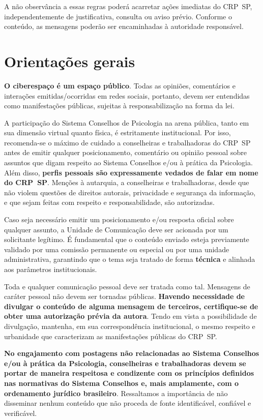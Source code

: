 A não observância a essas regras poderá acarretar ações imediatas do
CRP~SP, independentemente de justificativa, consulta ou aviso prévio.
Conforme o conteúdo, as mensagens poderão ser encaminhadas à autoridade
responsável.

\clearpage
\section{Orientações gerais}

\textbf{O ciberespaço é um espaço público}. Todas as opiniões,
comentários e interações emitidas/ocorridas em redes sociais, portanto,
devem ser entendidas como manifestações públicas, sujeitas à
responsabilização na forma da lei.

A participação do Sistema Conselhos de Psicologia na arena pública,
tanto em sua dimensão virtual quanto física, é estritamente
institucional. Por isso, recomenda-se o máximo de cuidado a conselheiras
e trabalhadoras do CRP~SP antes de emitir qualquer posicionamento,
comentário ou opinião pessoal sobre assuntos que digam respeito ao
Sistema Conselhos e/ou à prática da Psicologia. Além disso,
\textbf{perfis pessoais são expressamente vedados de falar em nome do
	CRP~SP}. Menções à autarquia, a conselheiras e trabalhadoras, desde que
não violem questões de direitos autorais, privacidade e segurança da
informação, e que sejam feitas com respeito e responsabilidade, são
autorizadas.

Caso seja necessário emitir um posicionamento e/ou resposta oficial
sobre qualquer assunto, a Unidade de Comunicação deve ser acionada por
um solicitante legítimo. É fundamental que o conteúdo enviado esteja
previamente validado por uma comissão permanente ou especial ou por uma
unidade administrativa, garantindo que o tema seja tratado de forma
\textbf{técnica} e alinhada aos parâmetros institucionais.

Toda e qualquer comunicação pessoal deve ser tratada como tal. Mensagens
de caráter pessoal não devem ser tornadas públicas. \textbf{Havendo
	necessidade de divulgar o conteúdo de alguma mensagem de terceiros,
	certifique-se de obter uma autorização prévia da autora}. Tendo em vista
a possibilidade de divulgação, mantenha, em sua correspondência
institucional, o mesmo respeito e urbanidade que caracterizam as
manifestações públicas do CRP~SP.

\textbf{No engajamento com postagens não relacionadas ao Sistema
	Conselhos e/ou à prática da Psicologia, conselheiras e trabalhadoras
	devem se portar de maneira respeitosa e condizente com os princípios
	definidos nas normativas do Sistema Conselhos e, mais amplamente, com o
	ordenamento jurídico brasileiro}. Ressaltamos a importância de não
disseminar nenhum conteúdo que não proceda de fonte identificável,
confiável e verificável.


